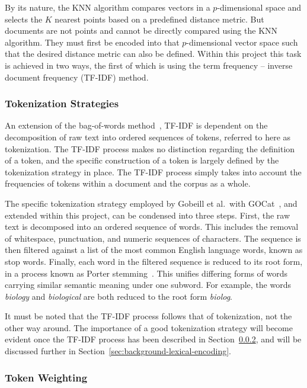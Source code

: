 \documentclass[11pt]{article}
\theoremstyle{plain}
\theoremstyle{definition}
\begin{document}
By its nature, the KNN algorithm compares vectors in a $p$-dimensional space and selects the $K$ nearest points based on a predefined distance metric. But documents are not points and cannot be directly compared using the KNN algorithm. They must first be encoded into that $p$-dimensional vector space such that the desired distance metric can also be defined. Within this project this task is achieved in two ways, the first of which is using the term frequency -- inverse document frequency (TF-IDF) method.

\subsubsection{Tokenization Strategies}\label{sec:background-lexical-tokenization}

An extension of the bag-of-words method~\cite{kim/2019/multicotraining}, TF-IDF  is dependent on the decomposition of raw text into ordered sequences of tokens, referred to here as tokenization. The TF-IDF process makes no distinction regarding the definition of a token, and the specific construction of a token is largely defined by the tokenization strategy in place. The TF-IDF process simply takes into account the frequencies of tokens within a document and the corpus as a whole.

The specific tokenization strategy employed by Gobeill et al.\ with GOCat~\cite{gobeill/2013/managing}, and extended within this project, can be condensed into three steps. First, the raw text is decomposed into an ordered sequence of words. This includes the removal of whitespace, punctuation, and numeric sequences of characters. The sequence is then filtered against a list of the most common English language words, known as stop words. Finally, each word in the filtered sequence is reduced to its root form, in a process known as Porter stemming~\cite{porter/1980/algorithm}. This unifies differing forms of words carrying similar semantic meaning under one subword. For example, the words \textit{biology} and \textit{biological} are both reduced to the root form \textit{biolog}.

It must be noted that the TF-IDF process follows that of tokenization, not the other way around. The importance of a good tokenization strategy will become evident once the TF-IDF process has been described in Section~\ref{sec:background-lexical-weighting}, and will be discussed further in Section~\ref{sec:background-lexical-encoding}.

\subsubsection{Token Weighting}\label{sec:background-lexical-weighting}
\end{document}
